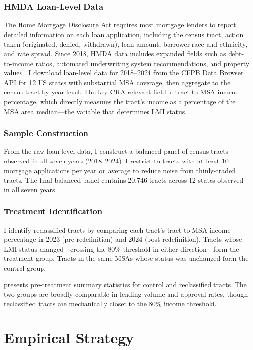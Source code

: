 \documentclass[12pt]{article}
\begin{document}
\subsubsection*{HMDA Loan-Level Data} The Home Mortgage Disclosure Act requires most mortgage lenders to report detailed information on each loan application, including the census tract, action taken (originated, denied, withdrawn), loan amount, borrower race and ethnicity, and rate spread. Since 2018, HMDA data includes expanded fields such as debt-to-income ratios, automated underwriting system recommendations, and property values \citep{Avery2005CRA}. I download loan-level data for 2018--2024 from the CFPB Data Browser API for 12 US states with substantial MSA coverage, then aggregate to the census-tract-by-year level. The key CRA-relevant field is tract-to-MSA income percentage, which directly measures the tract's income as a percentage of the MSA area median---the variable that determines LMI status.

\subsubsection*{Sample Construction} From the raw loan-level data, I construct a balanced panel of census tracts observed in all seven years (2018--2024). I restrict to tracts with at least 10 mortgage applications per year on average to reduce noise from thinly-traded tracts. The final balanced panel contains 20,746 tracts across 12 states observed in all seven years.

\subsubsection*{Treatment Identification} I identify reclassified tracts by comparing each tract's tract-to-MSA income percentage in 2023 (pre-redefinition) and 2024 (post-redefinition). Tracts whose LMI status changed---crossing the 80\% threshold in either direction---form the treatment group. Tracts in the same MSAs whose status was unchanged form the control group.



 presents pre-treatment summary statistics for control and reclassified tracts. The two groups are broadly comparable in lending volume and approval rates, though reclassified tracts are mechanically closer to the 80\% income threshold.

\section{Empirical Strategy}
\end{document}

